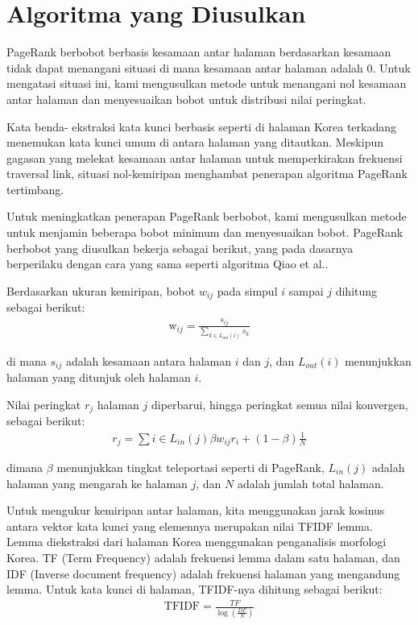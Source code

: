\documentclass[conference]{IEEEtran}
\begin{document}
\section{Algoritma yang Diusulkan}

PageRank berbobot berbasis kesamaan antar halaman berdasarkan kesamaan tidak dapat menangani situasi di mana kesamaan antar halaman adalah 0. Untuk mengatasi situasi ini, kami mengusulkan metode untuk menangani nol kesamaan antar halaman dan menyesuaikan bobot untuk distribusi nilai peringkat.

Kata benda-
ekstraksi kata kunci berbasis seperti di halaman Korea terkadang menemukan kata kunci umum di antara halaman yang ditautkan. Meskipun gagasan yang melekat kesamaan antar halaman untuk memperkirakan frekuensi traversal link, situasi nol-kemiripan menghambat penerapan algoritma PageRank tertimbang.

Untuk meningkatkan penerapan PageRank berbobot,
kami mengusulkan metode untuk menjamin beberapa bobot minimum dan menyesuaikan bobot. PageRank berbobot yang diusulkan bekerja sebagai berikut, yang pada dasarnya berperilaku dengan cara yang sama seperti algoritma Qiao et al.\cite{qiao2010simrank}. 

Berdasarkan ukuran kemiripan, bobot $w_{ij}$ pada simpul $i$ sampai $j$ dihitung sebagai berikut:
\begin{eqnarray}
    \text{w}_{i j}=\frac{s_{i j}}{\sum_{k \in L_{out}(i)} s_{k}}
\end{eqnarray}

di mana $s_{ij}$ adalah kesamaan antara halaman $i$ dan $j$, dan $L_{out}(i)$ menunjukkan halaman yang ditunjuk oleh halaman $i$.

Nilai peringkat $r_{j}$ halaman $j$ diperbarui, hingga peringkat semua
nilai konvergen, sebagai berikut:
\begin{eqnarray}
    r_{j}=\sum{i \in L_{i n}(j)} \beta w_{i j} r_{i}+(1-\beta) \frac{1}{N}
\end{eqnarray}

dimana $\beta$ menunjukkan tingkat teleportasi seperti di PageRank, $L_{in}(j)$ adalah halaman yang mengarah ke halaman $j$, dan $N$ adalah jumlah total halaman.

Untuk mengukur kemiripan antar halaman, kita menggunakan jarak kosinus antara vektor kata kunci yang elemennya merupakan nilai TFIDF lemma. Lemma diekstraksi dari halaman Korea menggunakan penganalisis morfologi Korea. TF (Term Frequency) adalah frekuensi lemma dalam satu halaman,
dan IDF (Inverse document frequency) adalah frekuensi halaman yang mengandung lemma.\cite{resnik1999semantic} Untuk kata kunci di halaman, TFIDF-nya dihitung sebagai berikut:
\begin{eqnarray}
    \mathrm{TFIDF}=\frac{T F}{\log \left(\frac{D F}{N}\right)}
\end{eqnarray}
\end{document}
